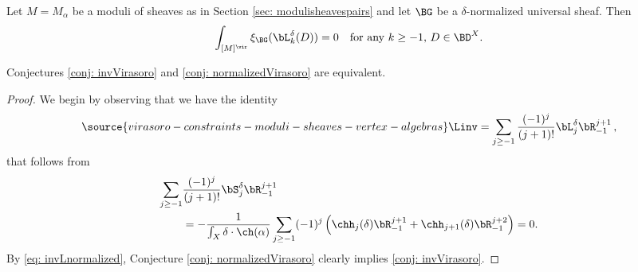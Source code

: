 \begin{conjecture}
\notready\label{conj: normalizedVirasoro}
Let $M=M_\alpha$ be a moduli of sheaves as in Section \ref{sec: modulisheavespairs} and let $\BG$ be a $\delta$-normalized universal sheaf. Then
\[\int_{[M]^\vir} \xi_\BG(\bL_k^\delta(D))=0  \quad \textup{for any }k\geq -1, \, D\in \BD^X.\]
\end{conjecture}

\begin{proposition}
\notready\label{prop: normalizedvsinv}
Conjectures \ref{conj: invVirasoro} and \ref{conj: normalizedVirasoro} are equivalent.
\end{proposition}
\begin{proof}
We begin by observing that we have the identity
\begin{equation}\label{eq: invLnormalized}
\source{virasoro-constraints-moduli-sheaves-vertex-algebras}
\Linv=\sum_{j\geq -1}\frac{(-1)^j}{(j+1)!}\bL_j^\delta \bR_{-1}^{j+1}\,,
\end{equation}
that follows from
\begin{align*}
\sum_{j\geq -1}&\frac{(-1)^j}{(j+1)!}\bS_j^\delta \bR_{-1}^{j+1}\\
&=-\frac{1}{\int_X \delta\cdot \ch(\alpha)}\sum_{j\geq -1}(-1)^j\left( \chh_j(\delta) \bR_{-1}^{j+1}+\chh_{j+1}(\delta)\bR_{-1}^{j+2}\right)=0.
\end{align*}
By \eqref{eq: invLnormalized}, Conjecture \ref{conj: normalizedVirasoro} clearly implies \ref{conj: invVirasoro}.


\end{proof}
